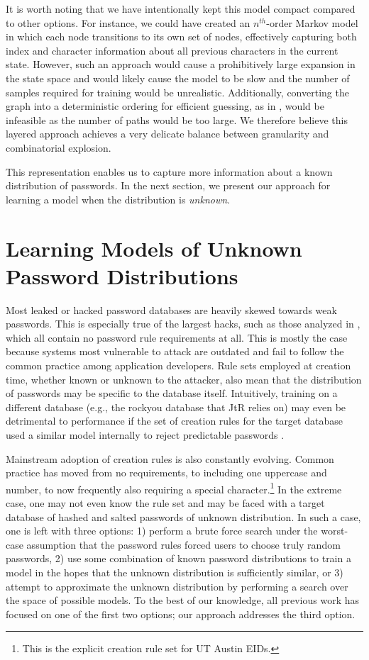 \documentclass{acm_proc_article-sp}
\begin{document}
It is worth noting that we have intentionally kept this model compact compared to other options. For instance, we could have created an $n^{th}$-order Markov model in which each node transitions to its own set of nodes, effectively capturing both index and character information about all previous characters in the current state. However, such an approach would cause a prohibitively large expansion in the state space and would likely cause the model to be slow and the number of samples required for training would be unrealistic. Additionally, converting the graph into a deterministic ordering for efficient guessing, as in \cite{narayanan-ccs05}, would be infeasible as the number of paths would be too large. We therefore believe this layered approach achieves a very delicate balance between granularity and combinatorial explosion.

This representation enables us to capture more information about a known distribution of passwords. In the next section, we present our approach for learning a model when the distribution is \textit{unknown}.

\section{Learning Models of Unknown Password Distributions}
\label{sec:evolution}

Most leaked or hacked password databases are heavily skewed towards weak passwords. This is especially true of the largest hacks, such as those analyzed in \cite{wier-ccs10}, which all contain no password rule requirements at all. This is mostly the case because systems most vulnerable to attack are outdated and fail to follow the common practice among application developers. Rule sets employed at creation time, whether known or unknown to the attacker, also mean that the distribution of passwords may be specific to the database itself. Intuitively, training on a different database (e.g., the rockyou database that JtR relies on) may even be detrimental to performance if the set of creation rules for the target database used a similar model internally to reject predictable passwords \cite{wier-ssp09, wier-ccs10}.

Mainstream adoption of creation rules is also constantly evolving. Common practice has moved from no requirements, to including one uppercase and number, to now frequently also requiring a special character.\footnote{This is the explicit creation rule set for UT Austin EIDs.} In the extreme case, one may not even know the rule set and may be faced with a target database of hashed and salted passwords of unknown distribution. In such a case, one is left with three options: 1) perform a brute force search under the worst-case assumption that the password rules forced users to choose truly random passwords, 2) use some combination of known password distributions to train a model in the hopes that the unknown distribution is sufficiently similar, or 3) attempt to approximate the unknown distribution by performing a search over the space of possible models. To the best of our knowledge, all previous work has focused on one of the first two options; our approach addresses the third option.
\end{document}
